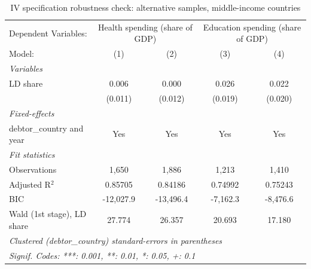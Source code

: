 
\begin{table}[htbp]
   \caption{\label{tab:IV_robustness_sample_changes_other} IV specification robustness check: alternative samples, middle-income countries}
   \centering
   \begin{tabular}{lcccc}
      \tabularnewline \midrule \midrule
      Dependent Variables: & \multicolumn{2}{c}{Health spending (share of GDP)} & \multicolumn{2}{c}{Education spending (share of GDP)}\\
      Model:                     & (1)       & (2)       & (3)      & (4)\\  
      \midrule
      \emph{Variables}\\
      LD share                   & 0.006     & 0.000     & 0.026    & 0.022\\   
                                 & (0.011)   & (0.012)   & (0.019)  & (0.020)\\   
      \midrule
      \emph{Fixed-effects}\\
      debtor\_country and year   & Yes       & Yes       & Yes      & Yes\\  
      \midrule
      \emph{Fit statistics}\\
      Observations               & 1,650     & 1,886     & 1,213    & 1,410\\  
      Adjusted R$^2$             & 0.85705   & 0.84186   & 0.74992  & 0.75243\\  
      BIC                        & -12,027.9 & -13,496.4 & -7,162.3 & -8,476.6\\  
      Wald (1st stage), LD share & 27.774    & 26.357    & 20.693   & 17.180\\  
      \midrule \midrule
      \multicolumn{5}{l}{\emph{Clustered (debtor\_country) standard-errors in parentheses}}\\
      \multicolumn{5}{l}{\emph{Signif. Codes: ***: 0.001, **: 0.01, *: 0.05, +: 0.1}}\\
   \end{tabular}
\end{table}


